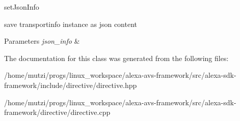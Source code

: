 set\+Json\+Info 

save transportinfo instance as json content 
\begin{DoxyParams}{Parameters}
{\em json\+\_\+info} & \\
\hline
\end{DoxyParams}


The documentation for this class was generated from the following files\+:\begin{DoxyCompactItemize}
\item 
/home/mutzi/progs/linux\+\_\+workspace/alexa-\/avs-\/framework/src/alexa-\/sdk-\/framework/include/directive/directive.\+hpp\item 
/home/mutzi/progs/linux\+\_\+workspace/alexa-\/avs-\/framework/src/alexa-\/sdk-\/framework/directive/directive.\+cpp\end{DoxyCompactItemize}
